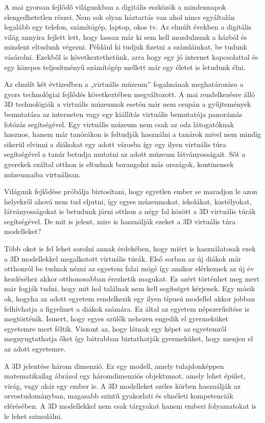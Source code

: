 A mai gyorsan fejlődő világunkban a digitális eszközök a mindennapok elengedhetetlen részei. Nem sok olyan háztartás van ahol nincs egyáltalán legalább egy telefon, számítógép, laptop, okos tv. Az elmúlt években a digitális világ annyira fejlett lett, hogy lassan már ki sem kell mozdulnunk a házból és mindent eltudunk végezni. Például ki tudjuk fizetni a számláinkat, be tudunk vásárolni. Ezekből is következtethetünk, arra hogy egy jó internet kapcsolattal és egy közepes teljesítményű számítógép mellett már egy életet is letudunk élni.

Az elmúlt két évtizedben a „virtuális múzeum” \cite{kersten2017development} fogalmának meghatározása a gyors technológiai fejlődés következtében megváltozott. A mai rendelkezésre álló 3D technológiák a virtuális múzeumok esetén már nem csupán a gyűjtemények bemutatása az interneten vagy egy kiállítás virtuális bemutatója panorámás fotózás segítségével. Egy virtuális múzeum nem csak az oda látogatóknak hasznos, hanem már tanórákon is feltudják használni a tanárok mivel nem mindig sikerül elvinni a diákokat egy adott városba így egy ilyen virtuális túra segítségével a tanár betudja mutatni az adott múzeum látványosságait. Sőt a gyerekek ezáltal otthon is eltudnak barangolni más országok, kontinensek múzeumaiba virtuálisan.

Világunk fejlődése próbálja biztosítani, hogy egyetlen ember se maradjon le azon helyekről ahová nem tud eljutni, így egyes múzeumokat, iskolákat, kastélyokat, látványosságokat is betudunk járni otthon a négy fal között a 3D virtuális túrák segítségével. De mit is jelent, mire is használják ezeket a 3D virtuális túra modelleket?

Több okot is fel lehet sorolni annak érdekében, hogy miért is használatosak ezek a 3D modellekkel megalkotott virtuális túrák. Első sorban az új diákok már otthonról be tudnak nézni az egyetem falai mögé így amikor elérkeznek az új év kezdéséhez akkor otthonosabban érezhetik magukat. Ez azért történhet meg mert már fogják tudni, hogy mit hol találnak nem kell segítséget kérjenek. Egy másik ok, hogyha az adott egyetem rendelkezik egy ilyen típusú modellel akkor jobban felhívhatja a figyelmet a diákok számára. Ez által az egyetem népszerűsítése is megtörténik. Ismert, hogy egyes szülők nehezen engedik el gyermeküket egyetemre mert féltik. Viszont az, hogy látnak egy  képet az egyetemről megnyugtathatja őket így bátrabban biztathatják gyermeküket, hogy menjen el az adott egyetemre. 

A 3D jelentése három dimenzió. Ez egy modell, amely tulajdonképpen matematikailag ábrázol egy háromdimenziós objektumot, amely lehet épület, virág, vagy akár egy ember is. A 3D modelleket széles körben használják az orvostudományban, magasabb szintű gyakorlati és elméleti kompetenciák elérésében. A 3D modellekkel nem csak tárgyakat hanem emberi folyamatokat is le lehet szimulálni.

